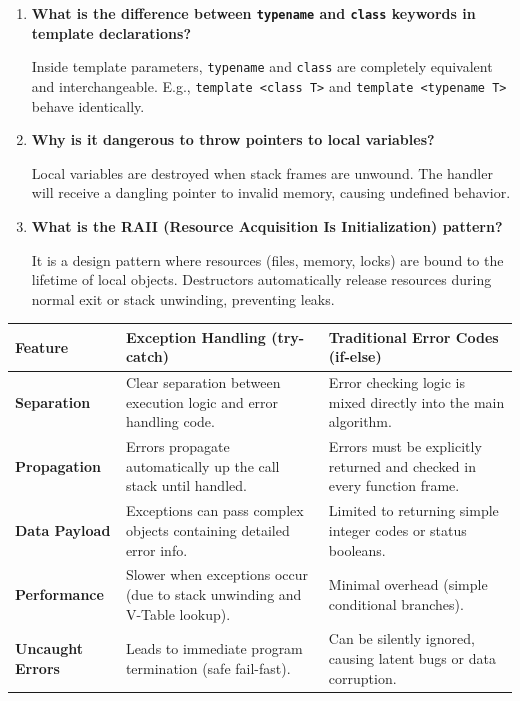 \documentclass[12pt,a4paper]{article}
\newcommand{\Q}[1]{\textbf{#1}\par\noindent\ignorespaces}
\renewcommand{\arraystretch}{1.45}
\begin{document}
\begin{tcolorbox}[exambox, title={\textbf{Frequently Asked / Viva Questions}}]
\begin{enumerate}[topsep=0pt, label=\textbf{Q\arabic*.}, itemsep=5pt]
  \item \Q{What is the difference between \texttt{typename} and \texttt{class} keywords in template declarations?}
    Inside template parameters, \texttt{typename} and \texttt{class} are completely equivalent and interchangeable. E.g., \texttt{template <class T>} and \texttt{template <typename T>} behave identically.
  \item \Q{Why is it dangerous to throw pointers to local variables?}
    Local variables are destroyed when stack frames are unwound. The handler will receive a dangling pointer to invalid memory, causing undefined behavior.
  \item \Q{What is the RAII (Resource Acquisition Is Initialization) pattern?}
    It is a design pattern where resources (files, memory, locks) are bound to the lifetime of local objects. Destructors automatically release resources during normal exit or stack unwinding, preventing leaks.
\end{enumerate}
\end{tcolorbox}

\begin{tcolorbox}[tikzbox, title={Comparison: Exception Handling vs. Traditional Error Return Codes}]
\renewcommand{\arraystretch}{1.45}
\par\noindent
\begin{tabularx}{\linewidth}{|B{3.2cm}|Y|Y|}
\hline
\textbf{Feature} & \textbf{\color{myteal}Exception Handling (try-catch)} & \textbf{\color{myamber}Traditional Error Codes (if-else)} \\
\hline
\textbf{Separation} & Clear separation between execution logic and error handling code. & Error checking logic is mixed directly into the main algorithm. \\
\hline
\textbf{Propagation} & Errors propagate automatically up the call stack until handled. & Errors must be explicitly returned and checked in every function frame. \\
\hline
\textbf{Data Payload} & Exceptions can pass complex objects containing detailed error info. & Limited to returning simple integer codes or status booleans. \\
\hline
\textbf{Performance} & Slower when exceptions occur (due to stack unwinding and V-Table lookup). & Minimal overhead (simple conditional branches). \\
\hline
\textbf{Uncaught Errors} & Leads to immediate program termination (safe fail-fast). & Can be silently ignored, causing latent bugs or data corruption. \\
\hline
\end{tabularx}
\end{tcolorbox}
\end{document}
